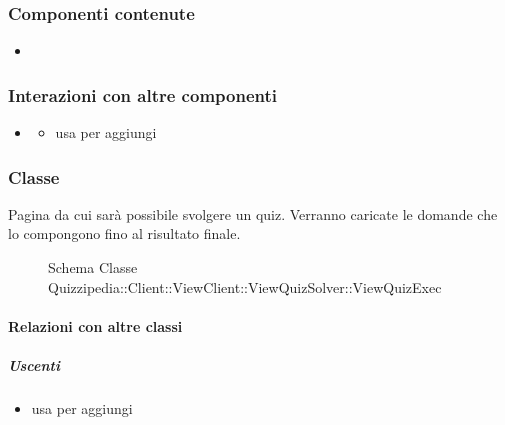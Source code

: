 \subsubsection{Componenti contenute}
\begin{itemize}
\item {}
\end{itemize}
\subsubsection{Interazioni con altre componenti}
\begin{itemize}
\item {}
\begin{itemize}
\item usa  per aggiungi
\end{itemize}
\end{itemize}
\subsubsection{Classe }
Pagina da cui sarà possibile svolgere un quiz. Verranno caricate le domande che lo compongono fino al risultato finale.
\begin{figure}[H]
\centering
\noindent{}
\caption[Schema Classe ViewQuizExec]{Schema Classe Quizzipedia::Client::ViewClient::ViewQuizSolver::ViewQuizExec}
\end{figure}
\paragraph{Relazioni con altre classi}
\subparagraph{Uscenti}
\begin{itemize}
\item usa  per aggiungi
\end{itemize}

